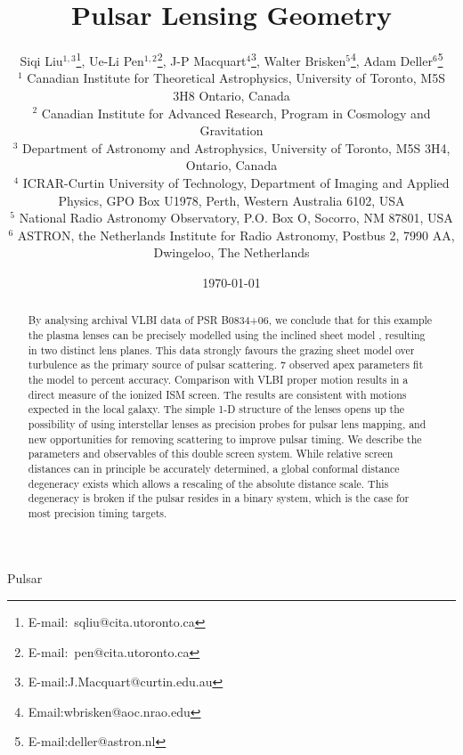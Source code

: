 \documentclass[useAMS,usenatbib]{mn2e}
\begin{document}
\title[Lensing Geometry]{
Pulsar Lensing Geometry
}

\author[Liu et al]{Siqi Liu$^{1,3}$\thanks{E-mail:\ sqliu@cita.utoronto.ca}, Ue-Li
  Pen$^{1,2}$\thanks{E-mail:\ pen@cita.utoronto.ca}, J-P Macquart$^{4}$\thanks{E-mail:J.Macquart@curtin.edu.au},
  Walter Brisken$^{5}$\thanks{Email:wbrisken@aoc.nrao.edu}, Adam Deller$^{6}$\thanks{E-mail:deller@astron.nl}\\
 $^1$ Canadian Institute for Theoretical Astrophysics, University of Toronto, M5S 3H8 Ontario, Canada \\
$^2$ Canadian Institute for Advanced Research, Program in Cosmology
and Gravitation\\
$^3$ Department of Astronomy and Astrophysics, University of Toronto, M5S 3H4, Ontario, Canada\\
$^4$ ICRAR-Curtin University of Technology, Department of Imaging and Applied Physics, GPO Box U1978, Perth, Western Australia 6102, USA \\
$^5$ National Radio Astronomy Observatory, P.O. Box O, Socorro, NM 87801, USA\\
$^6$ ASTRON, the Netherlands Institute for Radio Astronomy, Postbus 2, 7990 AA, Dwingeloo, The Netherlands\\
}

\date{\today}

\pagerange{\pageref{firstpage}--\pageref{lastpage}} 

\maketitle
\label{firstpage}
\begin{abstract}
By analysing archival VLBI data of PSR
B0834+06, we conclude that for this example the plasma lenses can be
precisely modelled using the inclined sheet model \citep{2014MNRAS.442.3338P},
resulting in two distinct lens planes.  This data strongly favours the
grazing sheet model over turbulence as the primary source of
pulsar scattering.  7 observed apex parameters fit the model to
percent accuracy. Comparison with VLBI proper motion results in a
direct measure of the ionized ISM screen.  The results are consistent
with motions expected in the local galaxy.
The simple 1-D structure of the lenses opens up
the possibility of using interstellar lenses as precision probes for
pulsar lens mapping, and new opportunities for removing scattering to
improve pulsar timing.
We describe the parameters and observables of this double screen
system.  While relative screen distances can in principle be
accurately determined,
a global conformal distance degeneracy exists which allows a rescaling
of the absolute distance scale.  This degeneracy is broken if the
pulsar resides in a binary system, which is the case for most
precision timing targets.

\end{abstract}
\begin{keywords}
Pulsar
\end{keywords}
\end{document}

